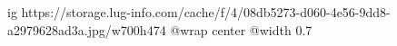  
 
 
 
 

\ifcmt
  ig https://storage.lug-info.com/cache/f/4/08db5273-d060-4e56-9dd8-a2979628ad3a.jpg/w700h474%
	@wrap center
	@width 0.7
\fi
